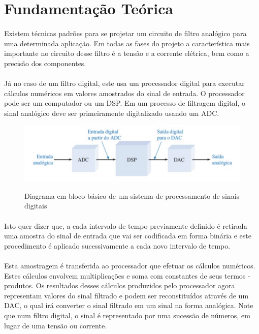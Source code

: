 \documentclass[12pt,fleqn]{article}
\begin{document}
\newpage

\section{Fundamentação Teórica}
\paragraph{} Existem técnicas padrões para se projetar um circuito de filtro analógico para uma determinada aplicação. Em todas as fases do projeto a característica mais importante no circuito desse filtro é a tensão e a corrente elétrica, bem como a precisão dos componentes.

\paragraph{} Já no caso de um filtro digital, este usa um processador digital para executar cálculos numéricos em valores amostrados do sinal de entrada. O processador pode ser um computador ou um DSP. Em um processo de filtragem digital, o sinal analógico deve ser primeiramente digitalizado usando um ADC.

\begin{figure}[!htb]
    \centering
    \includegraphics[scale=0.6]{fig/figura1.png}
    \label{figura:diagrama1}
    \caption{Diagrama em bloco básico de um sistema de processamento de sinais digitais}
\end{figure}

\paragraph{} Isto quer dizer que, a cada intervalo de tempo previamente definido é retirada uma amostra do sinal de entrada que vai ser codificada em forma binária e este procedimento é aplicado sucessivamente a cada novo intervalo de tempo.

\paragraph{} Esta amostragem é transferida ao processador que efetuar os cálculos numéricos. Estes cálculos envolvem multiplicações e soma com constantes de seus termos - produtos. Os resultados desses cálculos produzidos pelo processador agora representam valores do sinal filtrado e podem ser reconstituídos através de um DAC, o qual irá converter o sinal filtrado em um sinal na forma analógica. Note que num filtro digital, o sinal é representado por uma sucessão de números, em lugar de uma tensão ou corrente.
\end{document}
